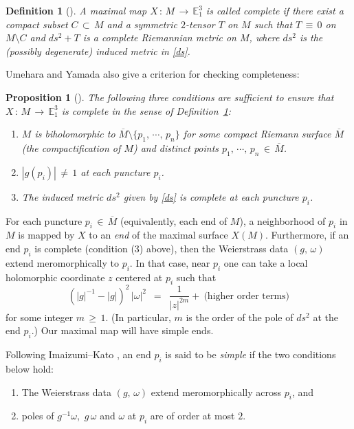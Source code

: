 \documentclass[12pt]{amsart}
\newtheorem{prop}{Proposition}[section]
\newtheorem{definition}[theorem]{Definition}
\numberwithin{equation}{section}
\begin{document}
\begin{definition}[{\cite[Definition~4.1]{UMEHARA2006}}]\label{defn:complete}
A maximal map $X\,:\, M\,\longrightarrow\, \mathbb{E}_1^3$ is called \emph{complete} if there exist a compact
subset $C \,\subset\, M$ and a symmetric $2$-tensor $T$ on $M$ such that $T\,\equiv\, 0$ on $M\setminus C$
and $ds^2+T$ is a complete Riemannian metric on $M$, where $ds^2$ is the (possibly degenerate) induced
metric in \eqref{ds}.
\end{definition}

Umehara and Yamada \cite{UMEHARA2006} also give a  criterion for checking completeness:

\begin{prop}[{\cite[Corollary~4.8]{UMEHARA2006}}]\label{defn:complete-criteria}
The following three conditions are sufficient to ensure that $X\,:\, M \,\longrightarrow\, \mathbb{E}_1^3$
is complete in the sense of Definition~\ref{defn:complete}:
\begin{enumerate}
\item $M$ is biholomorphic to $\overline{M}\setminus\{p_1,\,\cdots,\,p_n\}$ for some compact Riemann surface
$\overline{M}$ (the \emph{compactification} of $M$) and distinct points $p_1,\,\cdots,\,p_n\,\in\,\overline{M}$.
\item $|g(p_i)|\,\neq\, 1$ at each puncture $p_i$.
\item The induced metric $ds^2$ given by \eqref{ds} is complete at each puncture $p_i$.
\end{enumerate}
\end{prop}


For each puncture $p_i\,\in\, \overline{M}$ (equivalently, each end of $M$), a neighborhood of $p_i$
in $M$ is mapped by $X$ to an \emph{end} of the maximal surface $X(M)$. Furthermore, if an end $p_i$ is
complete (condition (3) above), then the Weierstrass data $(g,\,\omega)$ extend meromorphically to $p_i$. In
that case, near $p_i$ one can take a local holomorphic coordinate $z$ centered at $p_i$ such that 
\[ 
(|g|^{-1}-|g|)^2\,|\omega|^2\ \;=\ \; \frac{1}{|z|^{2m}} +\ \text{(higher order terms)}
\] 
for some integer ${m\,\ge\, 1}$. (In particular, $m$ is the order of the pole of $ds^2$ at
the end $p_i$.)  Our maximal map will have simple ends.

Following Imaizumi--Kato \cite{IK}, an end $p_i$ is said to be \textit{simple} if the
two conditions below hold:
\begin{enumerate}
\item The Weierstrass data $(g,\,\omega)$ extend meromorphically across $p_i$, and 
\item poles of $g^{-1}\omega$,\, $g\,\omega$ and $\omega$ at $p_i$ are of order at most $2$. 
\end{enumerate}
\end{document}
